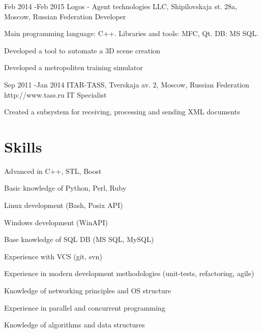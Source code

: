 \documentclass[10pt]{article} %
\begin{document}

\job
{Feb 2014 -}{Feb 2015}
{Logos - Agent technologies LLC, Shipilovskaja st. 28a, Moscow, Russian Federation}
{}
{Developer}
{
Main programming language: C++. Libraries and tools: MFC, Qt. DB: MS SQL.
\begin{itemize-noindent}
\setlength\itemsep{0em}
\item{Developed a tool to automate a 3D scene creation}
\item{Developed a metropoliten training simulator}
\end{itemize-noindent}
}


\job
{Sep 2011 -}{Jan 2014}
{ITAR-TASS, Tverskaja av. 2, Moscow, Russian Federation}
{http://www.tass.ru}
{IT Specialist}
{
\begin{itemize-noindent}
\setlength\itemsep{0em}
\item{Created a subsystem for receiving, processing and sending XML documents}
\end{itemize-noindent}
}


\section{Skills}

\begin{multicols}{2}
\begin{itemize-noindent}
\setlength\itemsep{0em}
\item Advanced in C++, STL, Boost
\item Basic knowledge of Python, Perl, Ruby
\item Linux development (Bash, Posix API)
\item Windows development (WinAPI)
\item Base knowledge of SQL DB (MS SQL, MySQL)
\item Experience with VCS (git, svn)
\item Experience in modern development methodologies (unit-tests, refactoring, agile)
\item Knowledge of networking principles and OS structure
\item Experience in parallel and concurrent programming
\item Knowledge of algorithms and data structures
\end{itemize-noindent}
\end{multicols}
\end{document}
